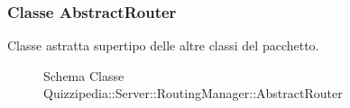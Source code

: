 \subsubsection{Classe AbstractRouter}
Classe astratta supertipo delle altre classi del pacchetto.
\begin{figure}[H]
\centering
\noindent{}
\caption[Schema Classe AbstractRouter]{Schema Classe Quizzipedia::Server::RoutingManager::AbstractRouter}
\end{figure}
